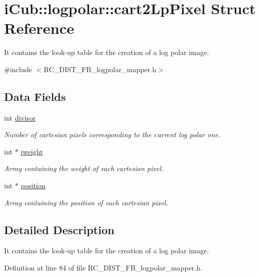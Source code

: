 \section{i\+Cub\+:\+:logpolar\+:\+:cart2\+Lp\+Pixel Struct Reference}
\label{structiCub_1_1logpolar_1_1cart2LpPixel}


It contains the look-\/up table for the creation of a log polar image.  




{\ttfamily \#include $<$R\+C\+\_\+\+D\+I\+S\+T\+\_\+\+F\+B\+\_\+logpolar\+\_\+mapper.\+h$>$}

\subsection*{Data Fields}
\begin{DoxyCompactItemize}
\item 
int \hyperlink{structiCub_1_1logpolar_1_1cart2LpPixel_ad3d40afcf0194c2333729044a0b10d3a}{divisor}
\begin{DoxyCompactList}\small\item\em Number of cartesian pixels corresponding to the current log polar one. \end{DoxyCompactList}\item 
int $\ast$ \hyperlink{structiCub_1_1logpolar_1_1cart2LpPixel_ad1672ced4db91126ae43b5fa27e3033e}{iweight}
\begin{DoxyCompactList}\small\item\em Array containing the weight of each cartesian pixel. \end{DoxyCompactList}\item 
int $\ast$ \hyperlink{structiCub_1_1logpolar_1_1cart2LpPixel_a4fe110e9885ce107c9d8f82ca12e204a}{position}
\begin{DoxyCompactList}\small\item\em Array containing the position of each cartesian pixel. \end{DoxyCompactList}\end{DoxyCompactItemize}


\subsection{Detailed Description}
It contains the look-\/up table for the creation of a log polar image. 

Definition at line 84 of file R\+C\+\_\+\+D\+I\+S\+T\+\_\+\+F\+B\+\_\+logpolar\+\_\+mapper.\+h.



